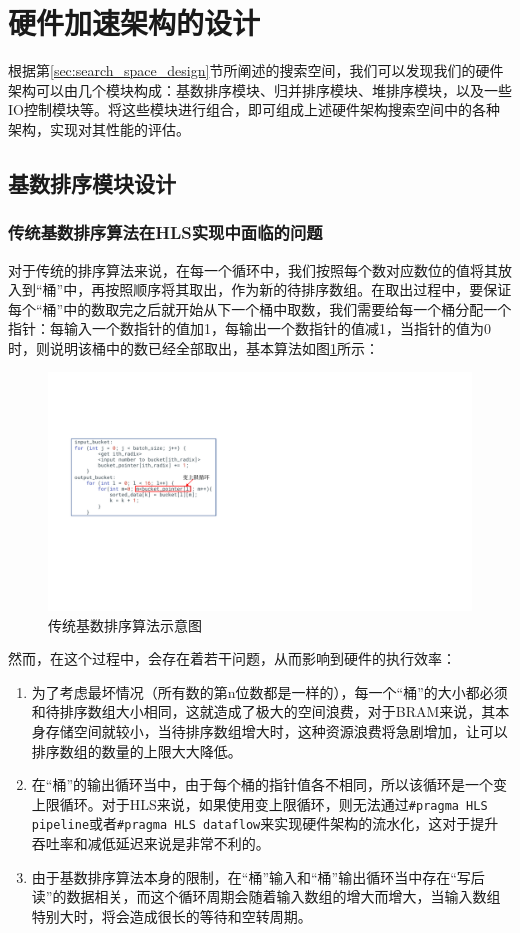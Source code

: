 \section{硬件加速架构的设计}

根据第\ref{sec:search_space_design}节所阐述的搜索空间，我们可以发现我们的硬件架构可以由几个模块构成：基数排序模块、归并排序模块、堆排序模块，以及一些IO控制模块等。将这些模块进行组合，即可组成上述硬件架构搜索空间中的各种架构，实现对其性能的评估。
\subsection{基数排序模块设计}
\subsubsection{传统基数排序算法在HLS实现中面临的问题}
对于传统的排序算法来说，在每一个循环中，我们按照每个数对应数位的值将其放入到“桶”中，再按照顺序将其取出，作为新的待排序数组。在取出过程中，要保证每个“桶”中的数取完之后就开始从下一个桶中取数，我们需要给每一个桶分配一个指针：每输入一个数指针的值加1，每输出一个数指针的值减1，当指针的值为0时，则说明该桶中的数已经全部取出，基本算法如图\ref{fig:traditional_radix_sort}所示：
\begin{figure}[htbp]
    \centering
    \includegraphics[width=12cm]{figures/traditional_radix_sort_algorithm.pdf}
    \caption{传统基数排序算法示意图}
    \label{fig:traditional_radix_sort}
\end{figure}

然而，在这个过程中，会存在着若干问题，从而影响到硬件的执行效率：
\begin{enumerate}
    \item 为了考虑最坏情况（所有数的第n位数都是一样的），每一个“桶”的大小都必须和待排序数组大小相同，这就造成了极大的空间浪费，对于BRAM来说，其本身存储空间就较小，当待排序数组增大时，这种资源浪费将急剧增加，让可以排序数组的数量的上限大大降低。
    \item 在“桶”的输出循环当中，由于每个桶的指针值各不相同，所以该循环是一个变上限循环。对于HLS来说，如果使用变上限循环，则无法通过\verb|#pragma HLS pipeline|或者\verb|#pragma HLS dataflow|来实现硬件架构的流水化，这对于提升吞吐率和减低延迟来说是非常不利的。
    \item 由于基数排序算法本身的限制，在“桶”输入和“桶”输出循环当中存在“写后读”的数据相关，而这个循环周期会随着输入数组的增大而增大，当输入数组特别大时，将会造成很长的等待和空转周期。
\end{enumerate}

